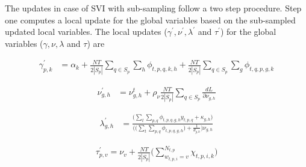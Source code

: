 \documentclass{sig-alternate}
\begin{document}
The updates in case of SVI with sub-sampling follow a two step procedure. Step
one computes a local update for the global variables based on the sub-sampled
updated local variables. The local updates ($\gamma^{'},
\nu^{'}, \lambda^{'}$ and $\tau^{'}$) for the global variables ($\gamma,
\nu, \lambda$ and $\tau$) are 

\begin{align}
\gamma_{p,k}^{'} &= \alpha_{k} + \frac{NT}{2|S_p|}\sum_{q \in S_p} \sum_{h}
\! \phi_{t,p,q,k,h} + \frac{NT}{2|S_p|}\sum_{q \in S_p} \! \sum_{g} \!
\phi_{t,q,p,g,k} 
\label{eqn:gammaUpStoc}
\end{align}
  

\begin{align}
\nu_{g,h}^{'} &= \nu_{g,h}^{t}+\rho_\nu \frac{NT}{2|S_p|}\sum_{q \in
S_p}\frac{dL}{\partial\nu_{g,h}}
\label{eqn:nuUpStoc}
\end{align}

\begin{align}
\lambda_{g,h}^{'} &= \frac{\bigg( \sum_{t} \! \sum_{p,q} \! \phi_{t,p,q,g,h}
y_{t,p,q} + \kappa_{g,h} \bigg) }{
 \bigg( \bigg( \sum_{t} \! \sum_{p,q} \! \phi_{t,p,q,g,h} \bigg) + 
\frac{1}{\theta_{g,h}} \bigg) \nu_{g,h}}
\label{eqn:lambdaUpStoc}
\end{align}

\begin{align}
\tau_{p,v}^{'} = \nu_{v} + \frac{NT}{2|S_p|} 
\bigg(\sum_{w_{t,p,i}=v}^{N_{t,p}} \chi_{t,p,i,k} \bigg) 
\label{eqn:tauUpStoc}
\end{align} 
\end{document}
